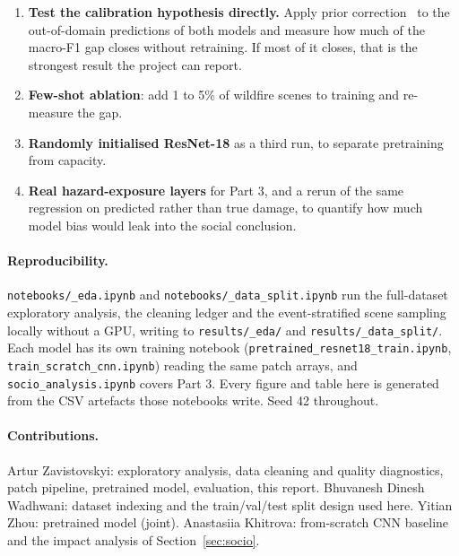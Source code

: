 \documentclass[10pt,twocolumn]{article}
\begin{document}
\begin{enumerate}[leftmargin=*,itemsep=2pt,topsep=3pt]
\item \textbf{Test the calibration hypothesis directly.} Apply prior correction~\cite{saerens} to the
out-of-domain predictions of both models and measure how much of the macro-F1 gap closes without
retraining. If most of it closes, that is the strongest result the project can report.
\item \textbf{Few-shot ablation}: add 1 to 5\% of wildfire scenes to training and re-measure the gap.
\item \textbf{Randomly initialised ResNet-18} as a third run, to separate pretraining from capacity.
\item \textbf{Real hazard-exposure layers} for Part 3, and a rerun of the same regression on
predicted rather than true damage, to quantify how much model bias would leak into the social
conclusion.
\end{enumerate}

\paragraph{Reproducibility.} \texttt{notebooks/\_eda.ipynb} and
\texttt{notebooks/\_data\_split.\allowbreak ipynb} run the full-dataset exploratory analysis, the cleaning
ledger and the event-stratified scene sampling locally without a GPU, writing to
\texttt{results/\_eda/} and \texttt{results/\_data\_split/}. Each model has its own training
notebook (\texttt{pretrained\_\allowbreak resnet18\_\allowbreak train.ipynb}, \texttt{train\_\allowbreak scratch\_\allowbreak cnn.ipynb}) reading the
same patch arrays, and \texttt{socio\_\allowbreak analysis.ipynb} covers Part 3. Every figure and table here is
generated from the CSV artefacts those notebooks write. Seed 42 throughout.

\paragraph{Contributions.} Artur Zavistovskyi: exploratory analysis, data cleaning and quality
diagnostics, patch pipeline, pretrained model, evaluation, this report. Bhuvanesh Dinesh Wadhwani:
dataset indexing and the train/val/test split design used here. Yitian Zhou: pretrained model
(joint). Anastasiia Khitrova: from-scratch CNN baseline and the impact analysis of
Section~\ref{sec:socio}.
\end{document}

